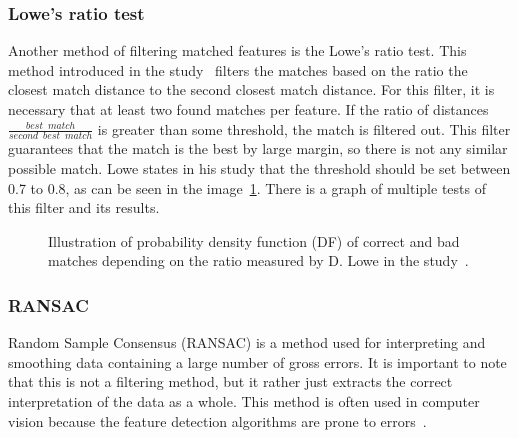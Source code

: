 \documentclass[thesis=B,english]{FITthesis}[2019/12/23]
\begin{document}
            \subsubsection*{Lowe's ratio test}
                Another method of filtering matched features is the Lowe's ratio test. This method introduced in the study~\cite{lowe2004distinctive} filters the matches based on the ratio the closest match distance to the second closest match distance. For this filter, it is necessary that at least two found matches per feature. If the ratio of distances \(\frac{best\enspace match}{second\enspace best\enspace match}\) is greater than some threshold, the match is filtered out. This filter guarantees that the match is the best by large margin, so there is not any similar possible match. Lowe states in his study that the threshold should be set between 0.7 to 0.8, as can be seen in the image~\ref{fig:lowesRatioTest}. There is a graph of multiple tests of this filter and its results.
                
                \begin{figure}
                    \centering
                    \caption[Probability density function (DF) of correct and bad matches]{Illustration of probability density function (DF) of correct and bad matches depending on the ratio measured by D. Lowe in the study~\cite{lowe2004distinctive}.}
                    \label{fig:lowesRatioTest}
                \end{figure}
                
            \subsubsection*{RANSAC}
                Random Sample Consensus (RANSAC) is a method used for interpreting and smoothing data containing a large number of gross errors. It is important to note that this is not a filtering method, but it rather just extracts the correct interpretation of the data as a whole. This method is often used in computer vision because the feature detection algorithms are prone to errors~\cite{Fischler1981}.
                
\end{document}
